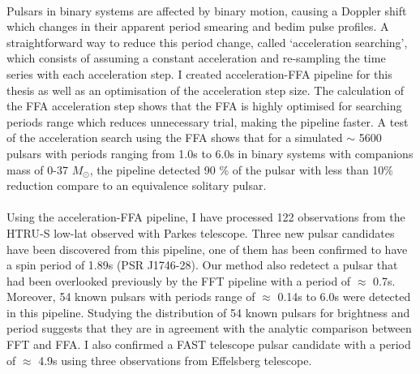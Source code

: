 \documentclass[../chapter1/thesis_msc.tex]{subfiles}
\begin{document}
\paragraph{} Pulsars in binary systems are affected by binary motion, causing a Doppler shift which changes in their apparent period smearing and bedim pulse profiles. 
A straightforward way to reduce this period change, called `acceleration searching', which consists of assuming a constant acceleration and re-sampling the time series with each acceleration step. I created acceleration-FFA pipeline for this thesis as well as an optimisation of the acceleration step size. The calculation of the FFA acceleration step shows that the FFA is highly optimised for searching periods range which reduces unnecessary trial, making the pipeline faster. A test of the acceleration search using the FFA shows that for a simulated $\sim$ 5600 pulsars with periods ranging from 1.0s to 6.0s in binary systems with companions mass of 0-37 $M_\odot$, the pipeline detected  90 \% of the pulsar with less than 10\% reduction  compare to an equivalence solitary pulsar.  

\paragraph{} Using the acceleration-FFA pipeline, I have processed 122 observations from the HTRU-S low-lat observed with Parkes telescope.
Three new pulsar candidates have been discovered from this pipeline, one of them has been confirmed to have a spin period of 1.89s (PSR J1746-28). 
Our method also redetect a pulsar that had been overlooked previously by the FFT pipeline with a period of $\approx$ 0.7s. Moreover, 54 known pulsars with periods range of $\approx$ 0.14s to 6.0s were detected in this pipeline. Studying the distribution of 54 known pulsars for brightness and period suggests that they are in agreement with the analytic comparison between FFT and FFA. I also confirmed a FAST telescope pulsar candidate with a period of $\approx$ 4.9s using three observations from Effelsberg telescope. 
    
    \clearpage
    \thispagestyle{empty}
\end{document}
